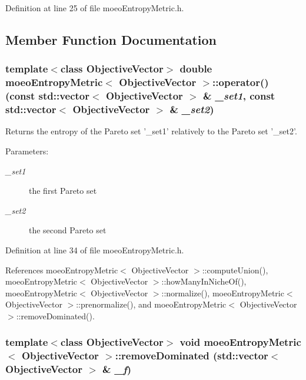 Definition at line 25 of file moeo\-Entropy\-Metric.h.

\subsection{Member Function Documentation}
\subsubsection{\setlength{\rightskip}{0pt plus 5cm}template$<$class Objective\-Vector$>$ double \bf{moeo\-Entropy\-Metric}$<$ Objective\-Vector $>$::operator() (const std::vector$<$ Objective\-Vector $>$ \& {\em \_\-set1}, const std::vector$<$ Objective\-Vector $>$ \& {\em \_\-set2})\hspace{0.3cm}{\tt  [inline]}}\label{classmoeoEntropyMetric_191a8cdda7873e20338e678c5a7b927b}


Returns the entropy of the Pareto set '\_\-set1' relatively to the Pareto set '\_\-set2'. 

\begin{Desc}
\item[Parameters:]
\begin{description}
\item[{\em \_\-set1}]the first Pareto set \item[{\em \_\-set2}]the second Pareto set \end{description}
\end{Desc}


Definition at line 34 of file moeo\-Entropy\-Metric.h.

References moeo\-Entropy\-Metric$<$ Objective\-Vector $>$::compute\-Union(), moeo\-Entropy\-Metric$<$ Objective\-Vector $>$::how\-Many\-In\-Niche\-Of(), moeo\-Entropy\-Metric$<$ Objective\-Vector $>$::normalize(), moeo\-Entropy\-Metric$<$ Objective\-Vector $>$::prenormalize(), and moeo\-Entropy\-Metric$<$ Objective\-Vector $>$::remove\-Dominated().
\subsubsection{\setlength{\rightskip}{0pt plus 5cm}template$<$class Objective\-Vector$>$ void \bf{moeo\-Entropy\-Metric}$<$ Objective\-Vector $>$::remove\-Dominated (std::vector$<$ Objective\-Vector $>$ \& {\em \_\-f})\hspace{0.3cm}{\tt  [inline, private]}}\label{classmoeoEntropyMetric_198a717fd0bab0bb91346399c1021f82}


